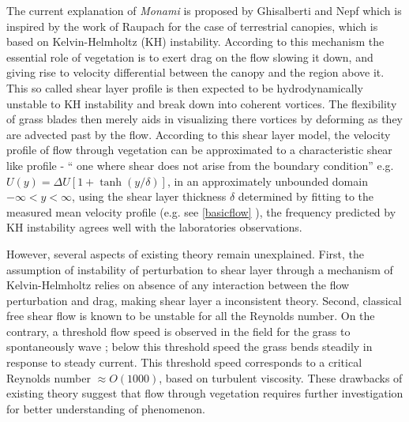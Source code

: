 \documentclass[12pt]{report}   %
\begin{document}
The current explanation of \textit{Monami} is proposed by Ghisalberti and Nepf \cite{Ghisal02,Nepf00} which is inspired by the work of Raupach for the case of terrestrial canopies, which is based on Kelvin-Helmholtz (KH) instability.
According to this mechanism the essential role of vegetation is to exert drag on the flow slowing it down, and giving rise to velocity differential between the canopy and the region above it. This so called shear layer profile is then expected to be hydrodynamically unstable to KH instability and break down into coherent vortices. The flexibility of grass blades then merely aids in visualizing there vortices by deforming as they are advected past by the flow.
According to this shear layer model, the velocity profile of flow through vegetation can be approximated to a characteristic shear like profile - `` one where shear does not arise from the boundary condition'' e.g. $U(y) = \Delta U[1+\tanh(y/\delta)]$, in an approximately unbounded domain $-\infty < y< \infty$, using the shear layer thickness $\delta$ determined by fitting to the measured mean velocity profile (e.g. see \ref{basicflow} ), the frequency predicted by KH instability agrees well with the laboratories observations.

However, several aspects of existing theory remain unexplained. First, the assumption of instability of perturbation to shear layer through a mechanism of Kelvin-Helmholtz relies on absence of any interaction between the flow perturbation and drag, making shear layer a inconsistent theory. Second, classical free shear flow is known to be unstable for all the Reynolds number. On the contrary, a threshold flow speed is observed in the field for the grass to spontaneously wave \cite{Grizzle96}; below this threshold speed the grass bends steadily in response to steady current. This threshold speed corresponds to a  critical Reynolds number $\approx O(1000)$, based on turbulent viscosity. These drawbacks of existing theory suggest that flow through vegetation requires further investigation for better understanding of phenomenon.
\end{document}

